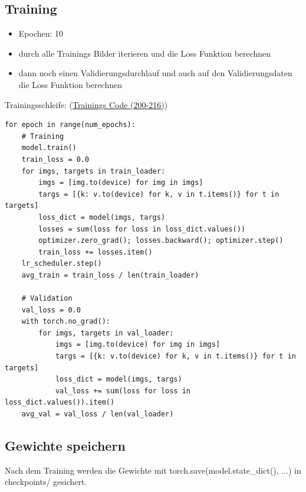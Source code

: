 \documentclass[11pt,a4paper]{article}
\begin{document}
\subsection{Training}
\begin{itemize}
\item Epochen: 10
\item durch alle Trainings Bilder iterieren und die Loss Funktion berechnen
\item dann noch einen Validierungsdurchlauf und auch auf den Validierungsdaten die Loss Funktion berechnen
\end{itemize}
Trainingsschleife:
(\href{https://github.com/7hands/Angewandte-Modellierung-25-Colmant/blob/main/Vortrag_Projeckt/image_detect.py}{Trainings Code (200-216)})
\begin{lstlisting}
for epoch in range(num_epochs):
    # Training
    model.train()
    train_loss = 0.0
    for imgs, targets in train_loader:
        imgs = [img.to(device) for img in imgs]
        targs = [{k: v.to(device) for k, v in t.items()} for t in targets]
        loss_dict = model(imgs, targs)
        losses = sum(loss for loss in loss_dict.values())
        optimizer.zero_grad(); losses.backward(); optimizer.step()
        train_loss += losses.item()
    lr_scheduler.step()
    avg_train = train_loss / len(train_loader)

    # Validation
    val_loss = 0.0
    with torch.no_grad():
        for imgs, targets in val_loader:
            imgs = [img.to(device) for img in imgs]
            targs = [{k: v.to(device) for k, v in t.items()} for t in targets]
            loss_dict = model(imgs, targs)
            val_loss += sum(loss for loss in loss_dict.values()).item()
    avg_val = val_loss / len(val_loader)
\end{lstlisting}

\subsection{Gewichte speichern}
Nach dem Training werden die Gewichte mit torch.save(model.state\_dict(), ...) in checkpoints/ gesichert.
\end{document}

